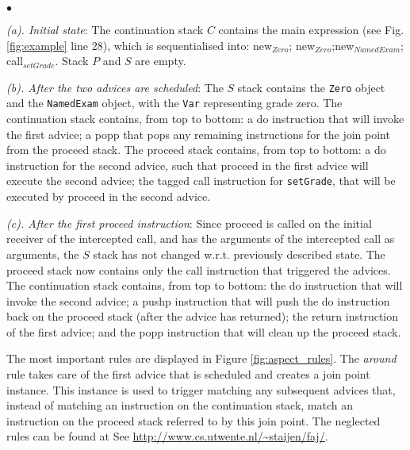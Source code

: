 \begin{list}{$\bullet$}{}
\item \emph{(a). Initial state}:  The continuation stack $C$ contains the main expression (see Fig. \ref{fig:example} line 28), which is sequentialised into: {\sc new}$_{Zero}$; {\sc new}$_{Zero}$;{\sc new}$_{NamedExam}$; {\sc call}$_{setGrade}$. Stack $P$ and $S$ are empty.
\item \emph{(b). After the two advices are scheduled}: The $S$ stack contains the {\tt Zero} object and the {\tt NamedExam} object, with the {\tt Var} representing grade zero. The continuation stack contains, from top to bottom: a {\sc do} instruction that will invoke the first advice; a {\sc popp} that pops any remaining instructions for the join point from the proceed stack. The proceed stack contains, from top to bottom: a {\sc do} instruction for the second advice, such that proceed in the first advice will execute the second advice; the tagged {\sc call} instruction for {\tt setGrade}, that will be executed by proceed in the second advice.
\item \emph{(c). After the first {\sc proceed} instruction}: Since proceed is called on the initial receiver of the intercepted {\sc call}, and has the arguments of the intercepted call as arguments, the $S$ stack has not changed w.r.t. previously described state. The proceed stack now contains only the {\sc call} instruction that triggered the advices. The continuation stack contains, from top to bottom: the {\sc do} instruction that will invoke the second advice; a {\sc pushp} instruction that will push the {\sc do} instruction back on the proceed stack (after the advice has returned); the {\sc return} instruction of the first advice; and the {\sc popp} instruction that will clean up the proceed stack.\\
\end{list}

The most important rules are displayed in Figure \ref{fig:aspect_rules}. The \emph{around} rule takes care of the first advice that is scheduled and creates a join point instance. This instance is used to trigger matching any subsequent advices that, instead of matching an instruction on the continuation stack, match an instruction on the proceed stack referred to by this join point. The neglected rules can be found at See \href{http://www.cs.utwente.nl/~staijen/faj/}{http://www.cs.utwente.nl/\~{}staijen/faj/}. 

\begin{figure*}[ht]
\centering
{}\\
\qquad\qquad
{}
\caption{The Rules for Advice Execution.}
\label{fig:aspect_rules}
\end{figure*}

